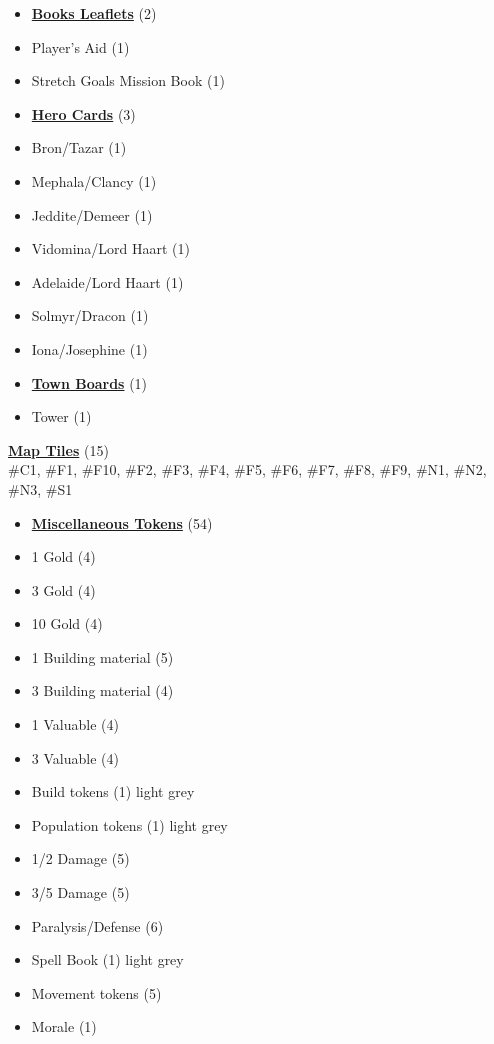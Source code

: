 
\begin{multicols}{3}

\small

\begin{itemize}[leftmargin=0pt, label={}, noitemsep, noitemsep]
  \item \textbf{\underline{Books Leaflets}} (2)
  \item Player's Aid (1)
  \item Stretch Goals Mission Book (1)
\end{itemize}

\begin{itemize}[leftmargin=0pt, label={}, noitemsep, noitemsep]
  \item \textbf{\underline{Hero Cards}} (3)
  \item Bron/Tazar (1)
  \item Mephala/Clancy (1)
  \item Jeddite/Demeer (1)
  \item Vidomina/Lord Haart (1)
  \item Adelaide/Lord Haart (1)
  \item Solmyr/Dracon (1)
  \item Iona/Josephine (1)
\end{itemize}

\begin{itemize}[leftmargin=0pt, label={}, noitemsep, noitemsep]
  \item \textbf{\underline{Town Boards}} (1)
  \item Tower (1)
\end{itemize}

\textbf{\underline{Map Tiles}} (15)\\
\#C1, \#F1, \#F10, \#F2, \#F3, \#F4, \#F5, \#F6, \#F7, \#F8, \#F9, \#N1, \#N2, \#N3, \#S1

\begin{itemize}[leftmargin=0pt, label={}, noitemsep, noitemsep]
  \item \textbf{\underline{Miscellaneous Tokens}} (54)
  \item 1 Gold (4)
  \item 3 Gold (4)
  \item 10 Gold (4)
  \item 1 Building material (5)
  \item 3 Building material (4)
  \item 1 Valuable (4)
  \item 3 Valuable (4)
  \item Build tokens (1) {light grey}
  \item Population tokens (1) {light grey}
  \item 1/2 Damage (5)
  \item 3/5 Damage (5)
  \item Paralysis/Defense (6)
  \item Spell Book (1) {light grey}
  \item Movement tokens (5)
  \item Morale (1)
\end{itemize}


\end{multicols}
